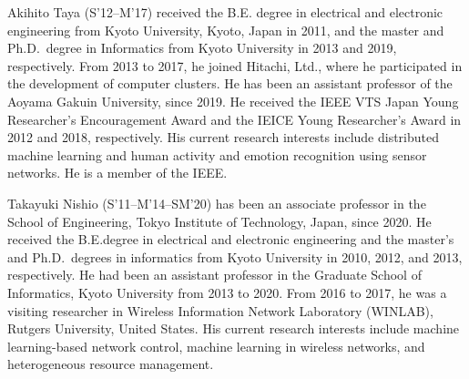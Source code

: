 \documentclass[journal]{IEEEtran}
\begin{document}




% 

\begin{IEEEbiography}{Akihito Taya}
(S'12--M'17) received the B.E. degree in electrical and electronic engineering from Kyoto University, Kyoto, Japan in 2011,
and the master and Ph.D.\ degree in Informatics from Kyoto University in 2013 and 2019, respectively.
From 2013 to 2017, he joined Hitachi, Ltd., where he participated in the development of computer clusters.
He has been an assistant professor of the Aoyama Gakuin University, since 2019.
He received the IEEE VTS Japan Young Researcher's Encouragement Award and the IEICE Young Researcher's Award in 2012 and 2018, respectively.
His current research interests include distributed machine learning and human activity and emotion recognition using sensor networks.
He is a member of the IEEE.
\end{IEEEbiography}

\begin{IEEEbiography}{Takayuki Nishio}
(S'11--M'14--SM'20) has been an associate professor in the School of Engineering, Tokyo Institute of Technology, Japan, since 2020. He received the B.E.degree in electrical and electronic engineering and the master's and Ph.D.\ degrees in informatics from Kyoto University in 2010, 2012, and 2013, respectively. He had been an assistant professor in the Graduate School of Informatics, Kyoto University from 2013 to 2020. From 2016 to 2017, he was a visiting researcher in Wireless Information Network Laboratory (WINLAB), Rutgers University, United States. His current research interests include machine learning-based network control, machine learning in wireless networks, and heterogeneous resource management.
\end{IEEEbiography}
\end{document}
